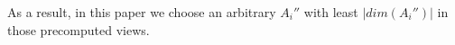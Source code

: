 \documentclass[10pt,journal,compsoc]{IEEEtran}
\begin{document}
As a result, in this paper we choose an arbitrary $ A_i'' $ with least $ |dim(A_i'')| $ in those precomputed views.
%
\end{document}
